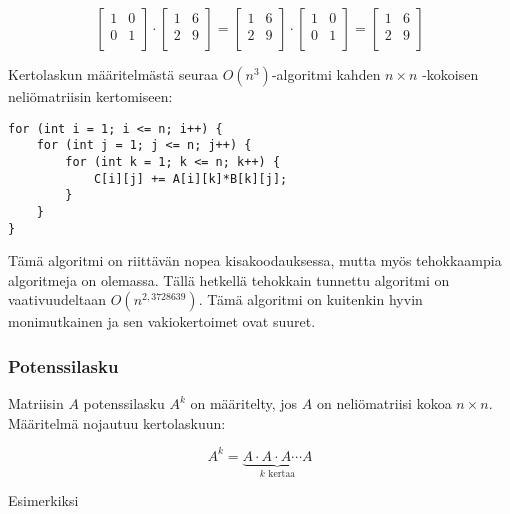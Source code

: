 \[
 \begin{bmatrix}
  1 & 0 \\
  0 & 1 \\
 \end{bmatrix}
\cdot
 \begin{bmatrix}
  1 & 6 \\
  2 & 9 \\
 \end{bmatrix}
=
 \begin{bmatrix}
  1 & 6 \\
  2 & 9 \\
 \end{bmatrix}
\cdot
 \begin{bmatrix}
  1 & 0 \\
  0 & 1 \\
 \end{bmatrix}
=
 \begin{bmatrix}
  1 & 6 \\
  2 & 9 \\
 \end{bmatrix}
\]

Kertolaskun määritelmästä seuraa $O(n^3)$-algoritmi
kahden $n \times n$ -kokoisen
neliömatriisin kertomiseen:

\begin{lstlisting}
for (int i = 1; i <= n; i++) {
    for (int j = 1; j <= n; j++) {
        for (int k = 1; k <= n; k++) {
            C[i][j] += A[i][k]*B[k][j];
        }
    }
}
\end{lstlisting}

Tämä algoritmi on riittävän nopea kisakoodauksessa,
mutta myös tehokkaampia algoritmeja on olemassa.
Tällä hetkellä tehokkain tunnettu
algoritmi on vaativuudeltaan $O(n^{2{,}3728639})$.
Tämä algoritmi on kuitenkin hyvin monimutkainen
ja sen vakiokertoimet ovat suuret.

\subsubsection{Potenssilasku}

Matriisin $A$ potenssilasku $A^k$ on
määritelty, jos $A$ on neliömatriisi kokoa $n \times n$.
Määritelmä nojautuu kertolaskuun:

\[ A^k = \underbrace{A \cdot A \cdot A \cdots A}_{\textrm{$k$ kertaa}} \]

Esimerkiksi

